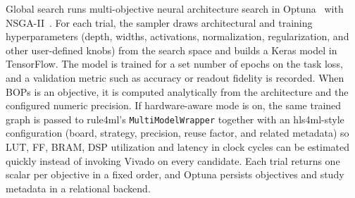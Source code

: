 \documentclass[11pt]{article}
\begin{document}


Global search runs multi-objective neural architecture search in Optuna~\citep{optuna_2019} with NSGA-II~\citep{NSGA}.
For each trial, the sampler draws architectural and training hyperparameters (depth, widths, activations, normalization, regularization, and other user-defined knobs) from the search space and builds a Keras model in TensorFlow.
The model is trained for a set number of epochs on the task loss, and a validation metric such as accuracy or readout fidelity is recorded.
When BOPs is an objective, it is computed analytically from the architecture and the configured numeric precision.
If hardware-aware mode is on, the same trained graph is passed to rule4ml's \texttt{MultiModelWrapper} together with an hls4ml-style configuration (board, strategy, precision, reuse factor, and related metadata) so LUT, FF, BRAM, DSP utilization and latency in clock cycles can be estimated quickly instead of invoking Vivado on every candidate.
Each trial returns one scalar per objective in a fixed order, and Optuna persists objectives and study metadata in a relational backend.
\end{document}
